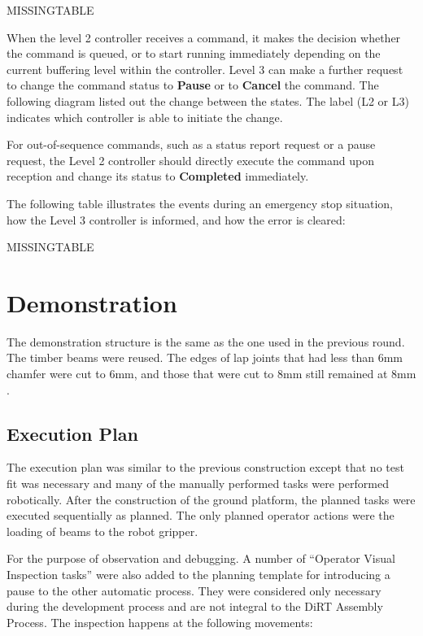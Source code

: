 MISSINGTABLE

When the level 2 controller receives a command, it makes the decision whether the command is queued, or to start running immediately depending on the current buffering level within the controller. Level 3 can make a further request to change the command status to \textbf{Pause }or to \textbf{Cancel }the command. The following diagram listed out the change between the states. The label (L2 or L3) indicates which controller is able to initiate the change. 

For out-of-sequence commands, such as a status report request or a pause request, the Level 2 controller should directly execute the command upon reception and change its status to \textbf{Completed }immediately.




The following table illustrates the events during an emergency stop situation, how the Level 3 controller is informed, and how the error is cleared:

MISSINGTABLE

\section{Demonstration}
\label{section:exploration-3-demonstration}

The demonstration structure is the same as the one used in the previous round. The timber beams were reused. The edges of lap joints that had less than 6mm chamfer were cut to 6mm, and those that were cut to 8mm still remained at 8mm . 

\subsection{Execution Plan}
\label{subsection:exploration-3-execution-plan}

The execution plan was similar to the previous construction except that no test fit was necessary and many of the manually performed tasks were performed robotically. After the construction of the ground platform, the planned tasks were executed sequentially as planned. The only planned operator actions were the loading of beams to the robot gripper. 

For the purpose of observation and debugging. A number of ``Operator Visual Inspection tasks'' were also added to the planning template for introducing a pause to the other automatic process. They were considered only necessary during the development process and are not integral to the DiRT Assembly Process. The inspection happens at the following movements:

